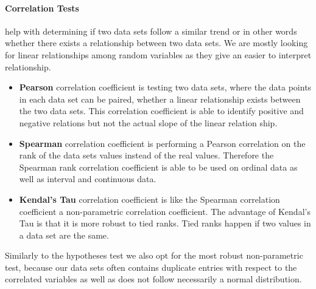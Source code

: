 \paragraph{Correlation Tests} help with determining if two data sets follow a similar trend or in other words whether there exists a relationship between two data sets.
We are mostly looking for linear relationships among random variables as they give an easier to interpret relationship.

\begin{itemize}
\item\textbf{Pearson} correlation coefficient is testing two data sets, where the data points in each data set can be paired, whether a linear relationship exists between the two data sets.
This correlation coefficient is able to identify positive and negative relations but not the actual slope of the linear relation ship.

\item\textbf{Spearman} correlation coefficient is performing a Pearson correlation on the rank of the data sets values instead of the real values.
Therefore the Spearman rank correlation coefficient is able to be used on ordinal data as well as interval and continuous data. 

\item\textbf{Kendal's Tau} correlation coefficient is like the Spearman correlation coefficient a non-parametric correlation coefficient.
The advantage of Kendal's Tau is that it is more robust to tied ranks.
Tied ranks happen if two values in a data set are the same.
\end{itemize}

Similarly to the hypotheses test we also opt for the most robust non-parametric test, because our data sets often contains duplicate entries with respect to the correlated variables as well as does not follow necessarily a normal distribution.

